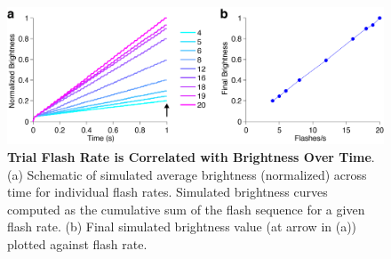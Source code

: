 \begin{figure}
  \centering
  	\includegraphics[width=\textwidth]{Figures/chapter2/brightness_simulation_unscaled.png}
  \caption[Flash Rate is Correlated with Brightness Over Time]{\textbf{Trial Flash Rate is Correlated with Brightness Over Time}. (a) Schematic of simulated average brightness (normalized) across time for individual flash rates. Simulated brightness curves computed as the cumulative sum of the flash sequence for a given flash rate. (b) Final simulated brightness value (at arrow in (a)) plotted against flash rate.}
   \label{fig:brightness_sim}
\end{figure}

